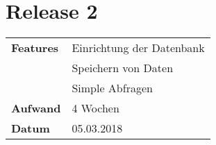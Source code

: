 
\section*{Release 2}
\label{sec:release_2}

\begin{tabular}{p{5cm} p{9cm}}
    \textbf{Features} & Einrichtung der Datenbank \\
    & Speichern von Daten \\
    & Simple Abfragen  \\
    \hline
    \textbf{Aufwand} & 4 Wochen\\
    \hline
    \textbf{Datum} & 05.03.2018
\end{tabular}
